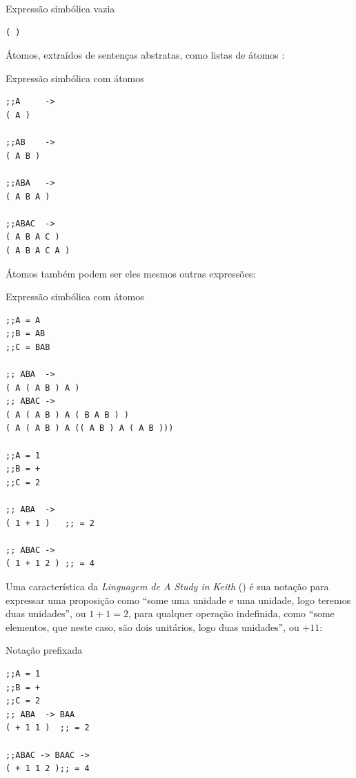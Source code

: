 \begin{example}{Expressão simbólica vazia}\label{ex:s-expression}
\begin{verbatim}
( )
\end{verbatim}
\end{example}

Átomos, extraídos de sentenças abstratas, como listas de átomos :

\begin{example}{Expressão simbólica com átomos}\label{ex:s-expression2}
\begin{verbatim}
;;A     -> 
( A )

;;AB    -> 
( A B )

;;ABA   ->
( A B A )

;;ABAC  ->
( A B A C )
( A B A C A )
\end{verbatim}
\end{example}

Átomos também podem ser eles mesmos outras expressões:

\begin{example}{Expressão simbólica com átomos}\label{ex:s-expression3}
\begin{verbatim}
;;A = A
;;B = AB
;;C = BAB

;; ABA  -> 
( A ( A B ) A )
;; ABAC ->
( A ( A B ) A ( B A B ) )
( A ( A B ) A (( A B ) A ( A B )))

;;A = 1
;;B = +
;;C = 2

;; ABA  -> 
( 1 + 1 )   ;; = 2

;; ABAC -> 
( 1 + 1 2 ) ;; = 4
\end{verbatim}
\end{example}

Uma característica da \emph{Linguagem de A Study in Keith} () é sua notação para expressar uma proposição como  ``some uma unidade e uma unidade, logo teremos duas unidades'',  ou $1+1=2$, para qualquer operação indefinida, como ``some elementos, que neste caso, são dois unitários, logo duas unidades'', ou $+ 1 1$:

\begin{example}{Notação prefixada}
\begin{verbatim}
;;A = 1
;;B = +
;;C = 2
;; ABA  -> BAA
( + 1 1 )  ;; = 2

;;ABAC -> BAAC -> 
( + 1 1 2 );; = 4
\end{verbatim}
\end{example}

